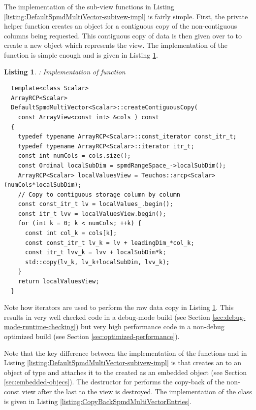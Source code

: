 \documentclass[pdf,ps2pdf,11pt]{SANDreport}
\newtheorem{listing}{Listing}
\begin{document}
The implementation of the sub-view functions in Listing
{}\ref{listing:DefaultSpmdMultiVector-subivew-impl} is fairly simple.
First, the private helper function {}
creates an {} object for a contiguous copy of
the non-contiguous columns being requested.  This contiguous copy of
data is then given over to to create a new
{} object which represents the view.  The
implementation of the function {} is
simple enough and is given in Listing
{}\ref{listing:DefaultSpmdMultiVector-createContiguousCopy}.


{}\begin{listing}: Implementation of {}
function {}
\label{listing:DefaultSpmdMultiVector-createContiguousCopy}
{\small\begin{verbatim}
  template<class Scalar>
  ArrayRCP<Scalar>
  DefaultSpmdMultiVector<Scalar>::createContiguousCopy(
    const ArrayView<const int> &cols ) const
  {
    typedef typename ArrayRCP<Scalar>::const_iterator const_itr_t;
    typedef typename ArrayRCP<Scalar>::iterator itr_t;
    const int numCols = cols.size();
    const Ordinal localSubDim = spmdRangeSpace_->localSubDim();
    ArrayRCP<Scalar> localValuesView = Teuchos::arcp<Scalar>(numCols*localSubDim);
    // Copy to contiguous storage column by column
    const const_itr_t lv = localValues_.begin();
    const itr_t lvv = localValuesView.begin();
    for (int k = 0; k < numCols; ++k) {
      const int col_k = cols[k];
      const const_itr_t lv_k = lv + leadingDim_*col_k;
      const itr_t lvv_k = lvv + localSubDim*k;
      std::copy(lv_k, lv_k+localSubDim, lvv_k);
    }
    return localValuesView;
  }
\end{verbatim}}
\end{listing}


Note how iterators are used to perform the raw data copy in Listing
{}\ref{listing:DefaultSpmdMultiVector-createContiguousCopy}.  This
results in very well checked code in a debug-mode build (see Section
{}\ref{sec:debug-mode-runtime-checking}) but very high performance
code in a non-debug optimized build (see Section
{}\ref{sec:optimized-performance}).

Note that the key difference between the implementation of the
functions {} and
{} in Listing
{}\ref{listing:DefaultSpmdMultiVector-subivew-impl} is that
{} creates an {} to an
object of type {} and attaches it
to the created {} as an
embedded object (see Section {}\ref{sec:embedded-objecs}).  The
destructor for {} performs the
copy-back of the non-const view after the last {} to the view
is destroyed.  The implementation of the class
{} is given in Listing
{}\ref{listing:CopyBackSpmdMultiVectorEntries}.
\end{document}
